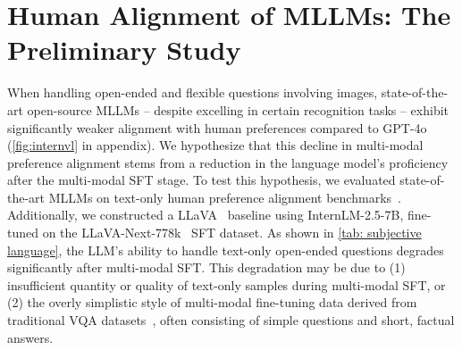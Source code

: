 \begin{comment}
重申一下，本章节性质是 Preliminary Study，内容是发现问题，然后尝试最 naive 的解决思路不 work。写作顺序按下面的写：
1. 使用 MLLM 过程中，发现 MLLM 的主观性能相比 LLM 差距较大 （定性）
2. 在 LLM 的 Human-Preference Benchmark 上测试 MLLM 进行验证，发现确实很差（定量）
3. (optional) 讨论 MLLM 主观性能下降可能的原因：刷点、数据质量差、etc. 
4. 尝试最 naive 的 solution (与 LM SFT 数据混训)，发现不 work：LLM Human-Preference Benchmark 上有大提升，但多模场景下：1. 综合能力掉点；2. Human-Preference Benchmark 上未有提升。注意，这里不需要 "ensure a fair comparison“，因为你要证明的不是说 magpie / condor 比 sharegpt4 好 (这是显然的)。你可以调整掺语言数据的量，然后拉条曲线 (线上 2、3 个点就可以)
5. 基于 4 中的发现，说我们需要构建多模的主观数据


\end{comment}
\section{Human Alignment of MLLMs: The Preliminary Study}
\label{sec: preliminary}
When handling open-ended and flexible questions involving images,
state-of-the-art open-source MLLMs -- 
despite excelling in certain recognition tasks -- 
exhibit significantly weaker alignment with human preferences compared to GPT-4o (\cref{fig:internvl} in appendix).
We hypothesize that this decline in multi-modal preference alignment stems from a reduction in the language model's proficiency after the multi-modal SFT stage. 
To test this hypothesis, we evaluated state-of-the-art MLLMs on text-only human preference alignment benchmarks~\cite{liu2023alignbench,alpaca_eval,li2024crowdsourced}.
Additionally, we constructed a LLaVA~\cite{liu2023visual} baseline using InternLM-2.5-7B, fine-tuned on the LLaVA-Next-778k~\cite{liu2023improved} SFT dataset. As shown in \cref{tab: subjective language}, 
the LLM’s ability to handle text-only open-ended questions degrades significantly after multi-modal SFT. 
This degradation may be due to (1) insufficient quantity or quality of text-only samples during multi-modal SFT, or (2) the overly simplistic style of multi-modal fine-tuning data derived from traditional VQA datasets~\cite{vqav2,hudson2019gqa}, often consisting of simple questions and short, factual answers.


